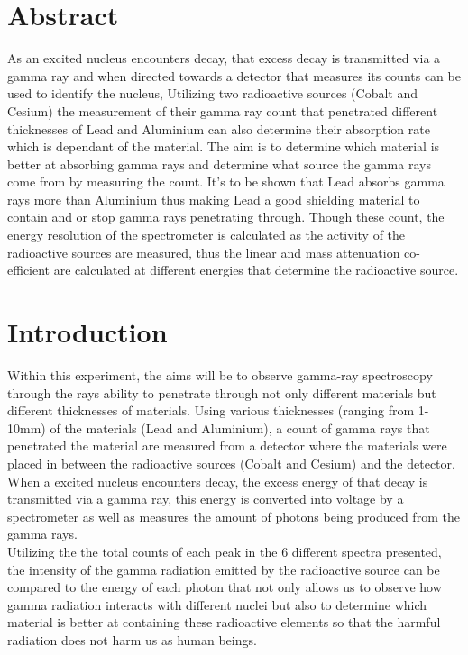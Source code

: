 \documentclass[12pt]{article}
\begin{document}
\section{Abstract}
\label{Abstract Section}

As an excited nucleus encounters decay, that excess decay is transmitted via a gamma ray and when directed towards a detector that measures its counts can be used to identify the nucleus, Utilizing two radioactive sources (Cobalt and Cesium) the measurement of their gamma ray count that penetrated different thicknesses of Lead and Aluminium can also determine their absorption rate which is dependant of the material. The aim is to determine which material is better at absorbing gamma rays and determine what source the gamma rays come from by measuring the count. It’s to be shown that Lead absorbs gamma rays more than Aluminium thus making Lead a good shielding material to contain and or stop gamma rays penetrating through. Though these count, the energy resolution of the spectrometer is calculated as the activity of the radioactive sources are measured, thus the linear and mass attenuation co-efficient are calculated at different energies that determine the radioactive source.

\section{Introduction}
\label{Introduction Section}

Within this experiment, the aims will be to observe gamma-ray spectroscopy through the rays ability to penetrate through not only different materials but different thicknesses of materials. Using various thicknesses (ranging from 1-10mm) of the materials (Lead and Aluminium), a count of gamma rays that penetrated the material are measured from a detector where the materials were placed in between the radioactive sources (Cobalt and Cesium) and the detector. When a excited nucleus encounters decay, the excess energy of that decay is transmitted via a gamma ray, this energy is converted into voltage by a spectrometer as well as measures the amount of photons being produced from the gamma rays. \\ [0.4cm]
Utilizing the the total counts of each peak in the 6 different spectra presented, the intensity of the gamma radiation emitted by the radioactive source can be compared to the energy of each photon that not only allows us to observe how gamma radiation interacts with different nuclei but also to determine which material is better at containing these radioactive elements so that the harmful radiation does not harm us as human beings. \\
\end{document}
